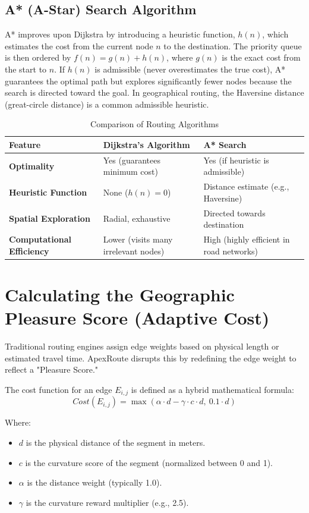 \documentclass[12pt,a4paper,oneside]{report}
\begin{document}
\subsection{A* (A-Star) Search Algorithm}
A* improves upon Dijkstra by introducing a heuristic function, $h(n)$, which estimates the cost from the current node $n$ to the destination. The priority queue is then ordered by $f(n) = g(n) + h(n)$, where $g(n)$ is the exact cost from the start to $n$. If $h(n)$ is admissible (never overestimates the true cost), A* guarantees the optimal path but explores significantly fewer nodes because the search is directed toward the goal. In geographical routing, the Haversine distance (great-circle distance) is a common admissible heuristic.

\begin{table}[h]
\centering
\caption{Comparison of Routing Algorithms}
\vspace{0.2cm}
\begin{tabularx}{\textwidth}{|X|X|X|}
\hline
\textbf{Feature} & \textbf{Dijkstra's Algorithm} & \textbf{A* Search} \\ \hline
\textbf{Optimality} & Yes (guarantees minimum cost) & Yes (if heuristic is admissible) \\ \hline
\textbf{Heuristic Function} & None ($h(n) = 0$) & Distance estimate (e.g., Haversine) \\ \hline
\textbf{Spatial Exploration} & Radial, exhaustive & Directed towards destination \\ \hline
\textbf{Computational Efficiency} & Lower (visits many irrelevant nodes) & High (highly efficient in road networks) \\ \hline
\end{tabularx}
\end{table}

\section{Calculating the Geographic Pleasure Score (Adaptive Cost)}
Traditional routing engines assign edge weights based on physical length or estimated travel time. ApexRoute disrupts this by redefining the edge weight to reflect a "Pleasure Score."

The cost function for an edge $E_{i,j}$ is defined as a hybrid mathematical formula:
\[ Cost(E_{i,j}) = \max(\alpha \cdot d - \gamma \cdot c \cdot d, \ 0.1 \cdot d) \]

Where:
\begin{itemize}
    \item $d$ is the physical distance of the segment in meters.
    \item $c$ is the curvature score of the segment (normalized between 0 and 1).
    \item $\alpha$ is the distance weight (typically 1.0).
    \item $\gamma$ is the curvature reward multiplier (e.g., 2.5).
\end{itemize}
\end{document}
